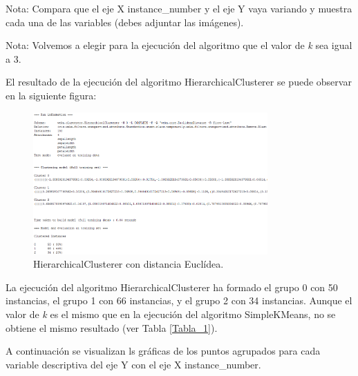 \documentclass[a4paper, 11pt]{exam}
\begin{document}
\begin{questions}
Nota: Compara que el eje X instance\_number y el eje Y vaya variando y muestra cada una de las variables (debes adjuntar las imágenes).

Nota: Volvemos a elegir para la ejecución del algoritmo que el valor de \textit{k} sea igual a 3.

El resultado de la ejecución del algoritmo HierarchicalClusterer se puede observar en la siguiente figura:

\begin{figure}[h]
	\centering
	\includegraphics[width=0.8\textwidth]{hc_euclidea.png}
	\caption{HierarchicalClusterer con distancia Euclídea.}
	\label{Figura_6}
\end{figure}

La ejecución del algoritmo HierarchicalClusterer ha formado el grupo 0 con 50 instancias, el grupo 1 con 66 instancias, y el grupo 2 con 34 instancias. Aunque el valor de \textit{k} es el mismo que en la ejecución del algoritmo SimpleKMeans, no se obtiene el mismo resultado (ver Tabla \ref{Tabla_1}).

A continuación se visualizan ls gráficas de los puntos agrupados para cada variable descriptiva del eje Y con el eje X instance\_number.


\end{questions}
\end{document}
